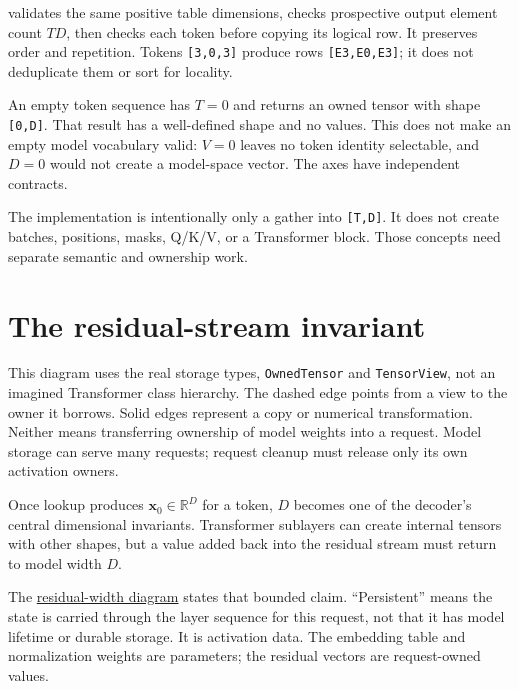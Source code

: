 \texttt{} validates the same
positive table dimensions, checks prospective output element count
\(TD\), then checks each token before copying its logical row. It
preserves order and repetition. Tokens \texttt{{[}3,0,3{]}} produce rows
\texttt{{[}E3,E0,E3{]}}; it does not deduplicate them or sort for
locality.

An empty token sequence has \(T=0\) and returns an owned tensor with
shape \texttt{{[}0,D{]}}. That result has a well-defined shape and no
values. This does not make an empty model vocabulary valid: \(V=0\)
leaves no token identity selectable, and \(D=0\) would not create a
model-space vector. The axes have independent contracts.

The implementation is intentionally only a gather into
\texttt{{[}T,D{]}}. It does not create batches, positions, masks, Q/K/V,
or a Transformer block. Those concepts need separate semantic and
ownership work.

\section{The residual-stream
invariant}\label{the-residual-stream-invariant}


This diagram uses the real storage types, \texttt{OwnedTensor} and
\texttt{TensorView}, not an imagined Transformer class hierarchy. The
dashed edge points from a view to the owner it borrows. Solid edges
represent a copy or numerical transformation. Neither means transferring
ownership of model weights into a request. Model storage can serve many
requests; request cleanup must release only its own activation owners.

Once lookup produces \(\mathbf{x}_0\in\mathbb{R}^{D}\) for a token,
\(D\) becomes one of the decoder's central dimensional invariants.
Transformer sublayers can create internal tensors with other shapes, but
a value added back into the residual stream must return to model width
\(D\).

The
\href{https://github.com/hermonai/inside-the-llm-engine/blob/astra-visual-rewrite/diagrams/transformer/residual-stream-width.txt}{residual-width
diagram} states that bounded claim. ``Persistent'' means the state is
carried through the layer sequence for this request, not that it has
model lifetime or durable storage. It is activation data. The embedding
table and normalization weights are parameters; the residual vectors are
request-owned values.

